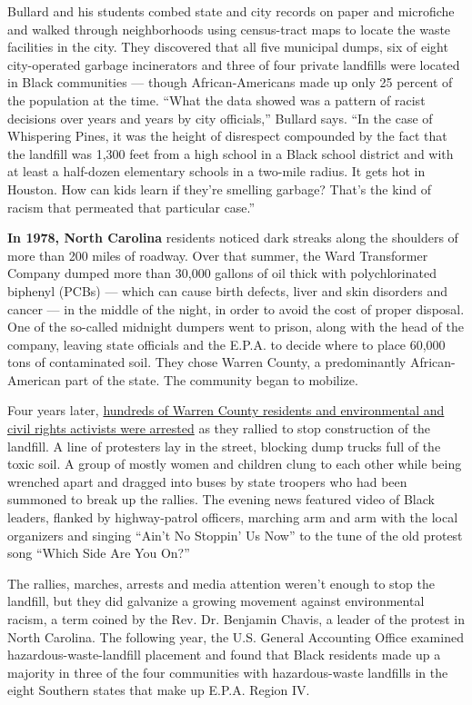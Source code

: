 Bullard and his students combed state and city records on paper and
microfiche and walked through neighborhoods using census-tract maps to
locate the waste facilities in the city. They discovered that all five
municipal dumps, six of eight city-operated garbage incinerators and
three of four private landfills were located in Black communities ---
though African-Americans made up only 25 percent of the population at
the time. ``What the data showed was a pattern of racist decisions over
years and years by city officials,'' Bullard says. ``In the case of
Whispering Pines, it was the height of disrespect compounded by the fact
that the landfill was 1,300 feet from a high school in a Black school
district and with at least a half-dozen elementary schools in a two-mile
radius. It gets hot in Houston. How can kids learn if they're smelling
garbage? That's the kind of racism that permeated that particular
case.''

\textbf{In 1978, North Carolina} residents noticed dark streaks along
the shoulders of more than 200 miles of roadway. Over that summer, the
Ward Transformer Company dumped more than 30,000 gallons of oil thick
with polychlorinated biphenyl (PCBs) --- which can cause birth defects,
liver and skin disorders and cancer --- in the middle of the night, in
order to avoid the cost of proper disposal. One of the so-called
midnight dumpers went to prison, along with the head of the company,
leaving state officials and the E.P.A. to decide where to place 60,000
tons of contaminated soil. They chose Warren County, a predominantly
African-American part of the state. The community began to mobilize.

Four years later,
\href{https://timeline.com/warren-county-dumping-race-4d8fe8de06cb}{hundreds
of Warren County residents and environmental and civil rights activists
were arrested} as they rallied to stop construction of the landfill. A
line of protesters lay in the street, blocking dump trucks full of the
toxic soil. A group of mostly women and children clung to each other
while being wrenched apart and dragged into buses by state troopers who
had been summoned to break up the rallies. The evening news featured
video of Black leaders, flanked by highway-patrol officers, marching arm
and arm with the local organizers and singing ``Ain't No Stoppin' Us
Now'' to the tune of the old protest song ``Which Side Are You On?''

The rallies, marches, arrests and media attention weren't enough to stop
the landfill, but they did galvanize a growing movement against
environmental racism, a term coined by the Rev. Dr. Benjamin Chavis, a
leader of the protest in North Carolina. The following year, the U.S.
General Accounting Office examined hazardous-waste-landfill placement
and found that Black residents made up a majority in three of the four
communities with hazardous-waste landfills in the eight Southern states
that make up E.P.A. Region IV.

